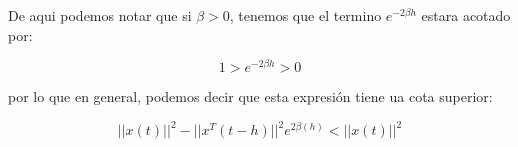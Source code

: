             De aqui podemos notar que si $\beta > 0$, tenemos que el termino $e^{-2 \beta h}$ estara acotado por:

            \begin{equation*}
                1 > e^{-2  \beta h} > 0
            \end{equation*}

            por lo que en general, podemos decir que esta expresión tiene ua cota superior:

            \begin{equation}
                || x(t) ||^2 - || x^T(t - h) ||^2 e^{2 \beta (h)} < || x(t) ||^2
            \end{equation}
